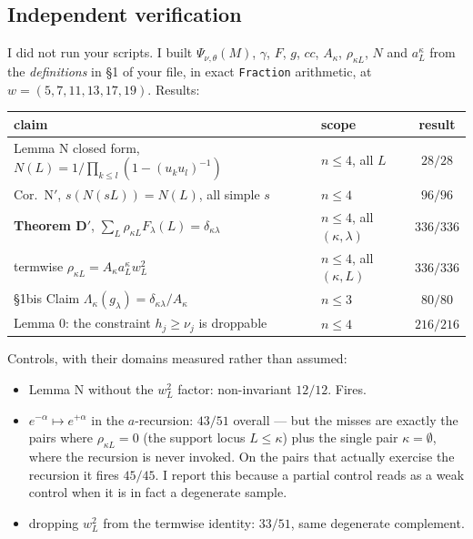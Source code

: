 \documentclass[11pt,a4paper]{article}
\begin{document}
\subsection{Independent verification}

I did not run your scripts. I built $\Psi_{\nu,\theta}(M)$, $\gamma$, $F$, $g$, $cc$, $A_\kappa$,
$\rho_{\kappa L}$, $N$ and $a^\kappa_L$ from the \emph{definitions} in \S1 of your file, in exact
\texttt{Fraction} arithmetic, at $w=(5,7,11,13,17,19)$. Results:

\begin{center}
\begin{tabular}{llc}
\toprule
claim & scope & result \\
\midrule
Lemma N closed form, $N(L)=1/\prod_{k\le l}(1-(u_ku_l)^{-1})$ & $n\le4$, all $L$ & $28/28$ \\
Cor.\ N$'$, $s(N(sL))=N(L)$, all simple $s$ & $n\le4$ & $96/96$ \\
\textbf{Theorem D$'$}, $\sum_L\rho_{\kappa L}F_\lambda(L)=\delta_{\kappa\lambda}$ & $n\le4$, all $(\kappa,\lambda)$ & $336/336$ \\
termwise $\rho_{\kappa L}=A_\kappa a^\kappa_Lw_L^2$ & $n\le4$, all $(\kappa,L)$ & $336/336$ \\
\S1bis Claim $\Lambda_\kappa(g_\lambda)=\delta_{\kappa\lambda}/A_\kappa$ & $n\le3$ & $80/80$ \\
Lemma 0: the constraint $h_j\ge\nu_j$ is droppable & $n\le4$ & $216/216$ \\
\bottomrule
\end{tabular}
\end{center}

Controls, with their domains measured rather than assumed:
\begin{itemize}
\item Lemma N without the $w_L^2$ factor: non-invariant $12/12$. Fires.
\item $e^{-\alpha}\mapsto e^{+\alpha}$ in the $a$-recursion: $43/51$ overall --- but the misses are
exactly the pairs where $\rho_{\kappa L}=0$ (the support locus $L\le\kappa$) plus the single pair
$\kappa=\emptyset$, where the recursion is never invoked. On the pairs that actually exercise the
recursion it fires $45/45$. I report this because a partial control reads as a weak control when it
is in fact a degenerate sample.
\item dropping $w_L^2$ from the termwise identity: $33/51$, same degenerate complement.
\end{itemize}
\end{document}
